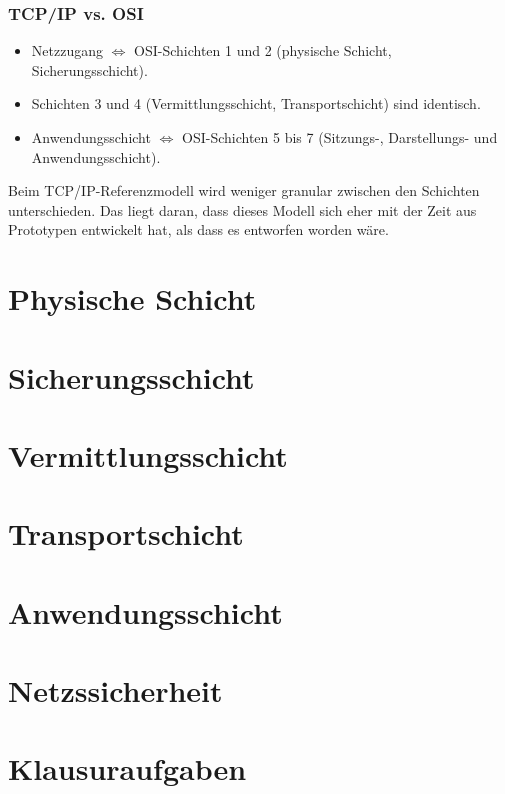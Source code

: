 \documentclass[a4paper, 14pt]{article}
\begin{document}
	\subsubsection{TCP/IP vs. OSI}

	\begin{itemize}
		\item Netzzugang $\Leftrightarrow$ OSI-Schichten 1 und 2 (physische Schicht, Sicherungsschicht).
		\item Schichten 3 und 4 (Vermittlungsschicht, Transportschicht) sind identisch.
		\item Anwendungsschicht $\Leftrightarrow$ OSI-Schichten 5 bis 7 (Sitzungs-, Darstellungs- und Anwendungsschicht).
	\end{itemize}

	Beim TCP/IP-Referenzmodell wird weniger granular zwischen den Schichten unterschieden.
	Das liegt daran, dass dieses Modell sich eher mit der Zeit aus Prototypen entwickelt hat, als dass es entworfen worden wäre.

	\section{Physische Schicht}

	\section{Sicherungsschicht}

	\section{Vermittlungsschicht}

	\section{Transportschicht}

	\section{Anwendungsschicht}

	\section{Netzssicherheit}

	\section{Klausuraufgaben}
\end{document}
